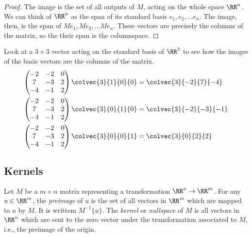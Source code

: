 \documentclass[fleqn]{report}
\begin{document}
\begin{proof}
The image is the set of all outputs of $M$, acting on the
whole space $\RR^n$. We can think of $\RR^n$ as the span of
its standard basis $e_1, e_2, \ldots e_n$. The image, then, is
the span of $Me_1, Me_2, \ldots Me_n$. These vectors are
precisely the columns of the matrix, so the their span is the
columnspace.
\end{proof}
\newpage

\begin{example}
Look at a $3 \times 3$ vector acting on the standard basis of
$\RR^3$ to see how the images of the basis vectors are the
columns of the matrix.
\begin{align*}
\left( \begin{matrix} 
-2 & -2 & 0 \\
7 & -3 & 2 \\
-4 & -1 & 2 
\end{matrix} \right) 
\colvec{3}{1}{0}{0} & = \colvec{3}{-2}{7}{-4} \\
\left( \begin{matrix} 
-2 & -2 & 0 \\
7 & -3 & 2 \\
-4 & -1 & 2 
\end{matrix} \right) 
\colvec{3}{0}{1}{0} & = \colvec{3}{-2}{-3}{-1} \\
\left( \begin{matrix} 
-2 & -2 & 0 \\
7 & -3 & 2 \\
-4 & -1 & 2 
\end{matrix} \right) 
\colvec{3}{0}{0}{1} & = \colvec{3}{0}{2}{2} \\
\end{align*}
\end{example}

\subsection{Kernels}
\label{kernels}

\begin{defn}
Let $M$ be a $m \times n$ matrix representing a transformation
$\RR^n \rightarrow \RR^m$. For any $u \in \RR^m$, the
\emph{preimage} of $u$ is the set of all vectors in $\RR^m$
which are mapped to $u$ by $M$. It is writtem $M^{-1}\{u\}$. 
The \emph{kernel} or \emph{nullspace} of $M$ is all vectors in
$\RR^n$ which are sent to the zero vector under the
transformation associated to $M$, i.e., the preimage of the
origin. 
\end{defn}
\end{document}
